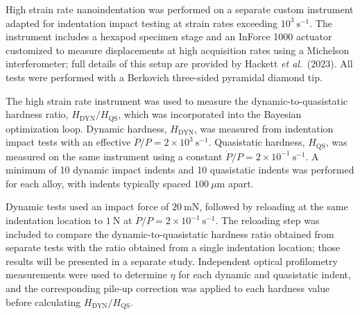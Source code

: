 \documentclass[preprint,12pt,times]{elsarticle}  %
\newcommand{\etal}{\textit{et al}.}
\begin{document}

High strain rate nanoindentation was performed on a separate custom instrument adapted for indentation impact testing at strain rates exceeding $10^{3}\ \mathrm{s^{-1}}$. The instrument includes a hexapod specimen stage and an InForce 1000 actuator customized to measure displacements at high acquisition rates using a Michelson interferometer; full details of this setup are provided by Hackett \etal\ (2023). All tests were performed with a Berkovich three-sided pyramidal diamond tip.

The high strain rate instrument was used to measure the dynamic-to-quasistatic hardness ratio, $H_{\mathrm{DYN}}/H_{\mathrm{QS}}$, which was incorporated into the Bayesian optimization loop. Dynamic hardness, $H_{\mathrm{DYN}}$, was measured from indentation impact tests with an effective $\dot{P}/P = 2 \times 10^{3}\ \mathrm{s^{-1}}$. Quasistatic hardness, $H_{\mathrm{QS}}$, was measured on the same instrument using a constant $\dot{P}/P = 2 \times 10^{-1}\ \mathrm{s^{-1}}$. A minimum of 10 dynamic impact indents and 10 quasistatic indents was performed for each alloy, with indents typically spaced $100\ \mu\mathrm{m}$ apart.

Dynamic tests used an impact force of $20\ \mathrm{mN}$, followed by reloading at the same indentation location to $1\ \mathrm{N}$ at $\dot{P}/P = 2 \times 10^{-1}\ \mathrm{s^{-1}}$. The reloading step was included to compare the dynamic-to-quasistatic hardness ratio obtained from separate tests with the ratio obtained from a single indentation location; those results will be presented in a separate study. Independent optical profilometry measurements were used to determine $\eta$ for each dynamic and quasistatic indent, and the corresponding pile-up correction was applied to each hardness value before calculating $H_{\mathrm{DYN}}/H_{\mathrm{QS}}$.
\end{document}
